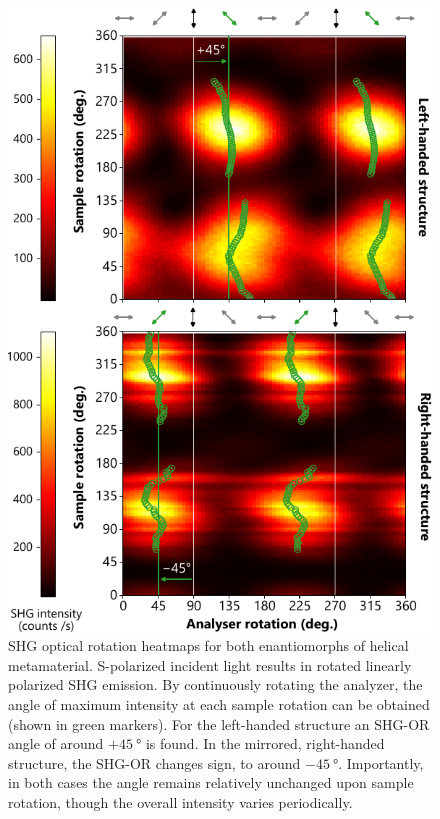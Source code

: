 \begin{figure}[htb!]	
    \centering	
    \includegraphics[scale=1]{./figures/results/OAinPlanarNanohelices/s_data.pdf}

    \caption{\label{fig:results:OAinPlanarNanohelices:s_data}
    SHG optical rotation heatmaps for both enantiomorphs of helical metamaterial. S-polarized incident light results in rotated linearly polarized SHG emission. By continuously rotating the analyzer, the angle of maximum intensity at each sample rotation can be obtained (shown in green markers). For the left-handed structure an SHG-OR angle of around $+\SI{45}{\degree}$ is found. In the mirrored, right-handed structure, the SHG-OR changes sign, to around $-\SI{45}{\degree}$. Importantly, in both cases the angle remains relatively unchanged upon sample rotation, though the overall intensity varies periodically.}	
\end{figure}

